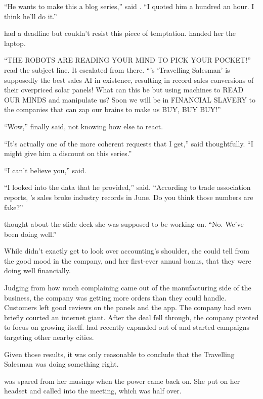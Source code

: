 ``He wants to make this a blog series,'' said {\sidetag}. ``I quoted him a hundred an hour. I think he'll do it.''

{\protag} had a deadline but couldn't resist this piece of temptation. {\sidetag} handed her the laptop.

``THE ROBOTS ARE READING YOUR MIND TO PICK YOUR POCKET!'' read the subject line. It escalated from there. ``{\energyCompany}'s `Travelling Salesman' is supposedly the best sales AI in existence, resulting in record sales conversions of their overpriced solar panels! What can this be but using machines to READ OUR MINDS and manipulate us? Soon we will be in FINANCIAL SLAVERY to the companies that can zap our brains to make us BUY, BUY BUY!''

``Wow,'' {\protag} finally said, not knowing how else to react.

``It's actually one of the more coherent requests that I get,'' {\sidetag} said thoughtfully. ``I might give him a discount on this series.''

``I can't believe you,'' {\protag} said.

``I looked into the data that he provided,'' {\sidetag} said. ``According to trade association reports, {\energyCompany}'s sales broke industry records in June. Do you think those numbers are fake?''

{\protag} thought about the slide deck she was supposed to be working on. ``No. We've been doing well.''

While {\protag} didn't exactly get to look over accounting's shoulder, she could tell from the good mood in the company, and her first-ever annual bonus, that they were doing well financially.

Judging from how much complaining came out of the manufacturing side of the business, the company was getting more orders than they could handle. Customers left good reviews on the panels and the app. The company had even briefly courted an internet giant. After the deal fell through, the company pivoted to focus on growing itself. {\energyCompany} had recently expanded out of \crunchyCity{} and started campaigns targeting other nearby cities.

Given those results, it was only reasonable to conclude that the Travelling Salesman was doing something right.

{\protag} was spared from her musings when the power came back on. She put on her headset and called into the meeting, which was half over.


